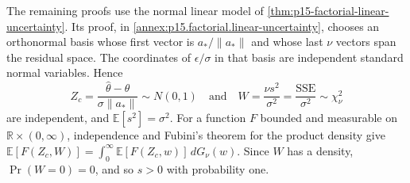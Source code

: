 The remaining proofs use the normal linear model of
\cref{thm:p15-factorial-linear-uncertainty}. Its proof, in
\cref{annex:p15.factorial.linear-uncertainty}, chooses an orthonormal
basis whose first vector is \(a_*/\|a_*\|\) and whose last \(\nu\) vectors
span the residual space. The coordinates of \(\epsilon/\sigma\) in that
basis are independent standard normal variables. Hence
\[
 Z_c=\frac{\widehat\theta-\theta}{\sigma\|a_*\|}\sim N(0,1)
 \quad\text{and}\quad
 W=\frac{\nu s^2}{\sigma^2}=\frac{\mathrm{SSE}}{\sigma^2}\sim\chi^2_\nu
\]
are independent, and \(\mathbb E[s^2]=\sigma^2\). For a function
\(F\) bounded and measurable on \(\mathbb R\times(0,\infty)\), independence
and Fubini's theorem for the product density give
\(\mathbb E[F(Z_c,W)]=\int_0^\infty\mathbb E[F(Z_c,w)]\,dG_\nu(w)\).
Since \(W\) has a density, \(\Pr(W=0)=0\), and so \(s>0\) with probability
one.

